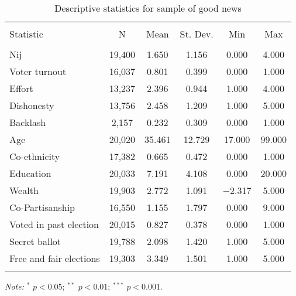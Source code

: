 
\begin{table}[htb] \centering 
  \caption{Descriptive statistics for sample of good news} 
  \label{} 
\begin{tabular}{@{\extracolsep{1pt}}lccccc} 
\\[-1.8ex]\hline 
\hline \\[-1.8ex] 
Statistic & \multicolumn{1}{c}{N} & \multicolumn{1}{c}{Mean} & \multicolumn{1}{c}{St. Dev.} & \multicolumn{1}{c}{Min} & \multicolumn{1}{c}{Max} \\ 
\hline \\[-1.8ex] 
Nij & 19,400 & 1.650 & 1.156 & 0.000 & 4.000 \\ 
Voter turnout & 16,037 & 0.801 & 0.399 & 0.000 & 1.000 \\ 
Effort & 13,237 & 2.396 & 0.944 & 1.000 & 4.000 \\ 
Dishonesty & 13,756 & 2.458 & 1.209 & 1.000 & 5.000 \\ 
Backlash & 2,157 & 0.232 & 0.309 & 0.000 & 1.000 \\ 
Age & 20,020 & 35.461 & 12.729 & 17.000 & 99.000 \\ 
Co-ethnicity & 17,382 & 0.665 & 0.472 & 0.000 & 1.000 \\ 
Education & 20,033 & 7.191 & 4.108 & 0.000 & 20.000 \\ 
Wealth & 19,903 & 2.772 & 1.091 & $-$2.317 & 5.000 \\ 
Co-Partisanship & 16,550 & 1.155 & 1.797 & 0.000 & 9.000 \\ 
Voted in past election & 20,015 & 0.827 & 0.378 & 0.000 & 1.000 \\ 
Secret ballot & 19,788 & 2.098 & 1.420 & 1.000 & 5.000 \\ 
Free and fair elections & 19,303 & 3.349 & 1.501 & 1.000 & 5.000 \\ 
\hline \\[-1.8ex] 
\end{tabular} 
\begin{flushleft}\textit{Note:}  $^*$ $p<0.05$; $^{**}$ $p<0.01$; $^{***}$ $p<0.001$. \end{flushleft}
\end{table} 
